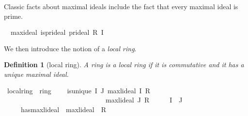 \documentclass[12pt]{scrartcl}
\newtheorem{definition}[proposition]{Definition}
\begin{document}
Classic facts about maximal ideals include the fact that every maximal ideal is prime.

\begin{isabelle}
\isamarkupfalse%
\ {\isacharparenleft}{\kern0pt}\ max{\isacharunderscore}{\kern0pt}ideal{\isacharparenright}{\kern0pt}\ is{\isacharunderscore}{\kern0pt}pr{\isacharunderscore}{\kern0pt}ideal{\isacharcolon}{\kern0pt}\ {\isachardoublequoteopen}pr{\isacharunderscore}{\kern0pt}ideal\ R\ I\ {\isacharparenleft}{\kern0pt}{\isacharplus}{\kern0pt}{\isacharparenright}{\kern0pt}\ {\isacharparenleft}{\kern0pt}{\isasymcdot}{\isacharparenright}{\kern0pt}\ {\isasymzero}\ {\isasymone}{\isachardoublequoteclose}
\end{isabelle}
	
We then introduce the notion of a \emph{local ring}.

\begin{definition}[local ring]
	A ring is a local ring if it is commutative and it has a unique maximal ideal. 	
\end{definition}

\begin{isabelle}
\isamarkupfalse%
\ local{\isacharunderscore}{\kern0pt}ring\ {\isacharequal}{\kern0pt}\ ring\ {\isacharplus}{\kern0pt}\isanewline
\ \ \ is{\isacharunderscore}{\kern0pt}unique{\isacharcolon}{\kern0pt}\ {\isachardoublequoteopen}{\isasymAnd}I\ J{\isachardot}{\kern0pt}\ max{\isacharunderscore}{\kern0pt}lideal\ I\ R\ {\isacharparenleft}{\kern0pt}{\isacharplus}{\kern0pt}{\isacharparenright}{\kern0pt}\ {\isacharparenleft}{\kern0pt}{\isasymcdot}{\isacharparenright}{\kern0pt}\ {\isasymzero}\ {\isasymone}\isanewline
\ \ \ \ \ \ \ \ \ \ \ \ \ \ \ \ \ \ \ \ \ \ \ \ \ \ \ \ \ {\isasymLongrightarrow}\ max{\isacharunderscore}{\kern0pt}lideal\ J\ R\ {\isacharparenleft}{\kern0pt}{\isacharplus}{\kern0pt}{\isacharparenright}{\kern0pt}\ {\isacharparenleft}{\kern0pt}{\isasymcdot}{\isacharparenright}{\kern0pt}\ {\isasymzero}\ {\isasymone}\ {\isasymLongrightarrow}\ I\ {\isacharequal}{\kern0pt}\ J{\isachardoublequoteclose}\isanewline
\ \ \ \ \ has{\isacharunderscore}{\kern0pt}max{\isacharunderscore}{\kern0pt}lideal{\isacharcolon}{\kern0pt}\ {\isachardoublequoteopen}{\isasymexists}{\isasymww}{\isachardot}{\kern0pt}\ max{\isacharunderscore}{\kern0pt}lideal\ {\isasymww}\ R\ {\isacharparenleft}{\kern0pt}{\isacharplus}{\kern0pt}{\isacharparenright}{\kern0pt}\ {\isacharparenleft}{\kern0pt}{\isasymcdot}{\isacharparenright}{\kern0pt}\ {\isasymzero}\ {\isasymone}{\isachardoublequoteclose}
\end{isabelle}
\end{document}
